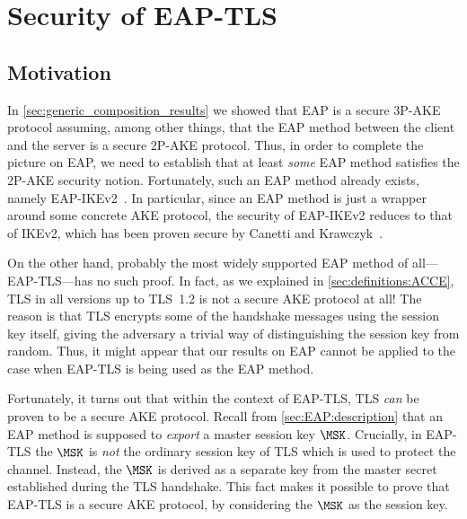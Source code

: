 \newcommand{\abort}{\operatorname{\mathsf{malicious-accept}}}
\newcommand{\CK}{\mathbf{CheckKey}}
\newcommand{\KOerror}{\mathsf{KOerror}}
\newcommand{\CKerror}{\mathsf{CKerror}}
\newcommand{\KDFcoll}{\operatorname{\mathit{ck}-\mathsf{coll}}}
\newcommand{\correct}{\mathsf{correctDec}}
\newcommand{\ncorrect}{\overline{\correct}}
\newcommand{\wrong}{\mathsf{wrongDec}}
\newcommand{\nwrong}{\overline{\wrong}}
\newcommand{\wrongMS}{\mathsf{wrongMS}}
\newcommand{\eventFresh}{\mathsf{fresh}}
\newcommand{\nfresh}{\operatorname{\mathsf{non-fresh}}}
\newcommand{\bwins}{\oracle.b = b'}
\newcommand{\KO}{\mathcal{KO}}


\chapter{Security of EAP-TLS}\label{sec:EAP-TLS-security}


\begingroup
\hypersetup{linkcolor=black}
\minitoc
\endgroup

\section{Motivation}\label{sec:EAP-TLS-security:intro}
In \cref{sec:generic_composition_results} we showed that EAP is a secure 3P-AKE protocol assuming, 
among other things,
that the EAP method between the client and the server is a secure 2P-AKE protocol.
Thus,
in order to complete the picture on EAP,
we need to establish that at least \emph{some} EAP method satisfies the 2P-AKE security notion. 
Fortunately,
such an EAP method already exists,
namely EAP-IKEv2~\cite{IETF:RFC5106:EAP-IKEv2}.
In particular,
since an EAP method is just a wrapper around some concrete AKE protocol,
the security of EAP-IKEv2 reduces to that of IKEv2, 
which has been proven secure by Canetti and Krawczyk~\cite{C:CanKra02}.

On the other hand,
probably the most widely supported EAP method of all---EAP-TLS---has no such proof.
In fact,
as we explained in \cref{sec:definitions:ACCE},
TLS in all versions up to TLS~1.2 is not a secure AKE protocol at all!
The reason is that TLS encrypts some of the handshake messages using the session key itself,
giving the adversary a trivial way of distinguishing the session key from random.
Thus,
it might appear that our results on EAP cannot be applied to the case when EAP-TLS is being used as the EAP method.

Fortunately,
it turns out that within the context of EAP-TLS,
TLS \emph{can} be proven to be a secure AKE protocol.
Recall from \cref{sec:EAP:description} that an EAP method is supposed to \emph{export} a master session key $\MSK$.
Crucially,
in EAP-TLS the $\MSK$ is \emph{not} the ordinary session key of TLS which is used to protect the channel.
Instead,
the $\MSK$ is derived as a separate key from the master secret established during the TLS handshake.
This fact makes it possible to prove that EAP-TLS is a secure AKE protocol,
by considering the $\MSK$ as the session key.


